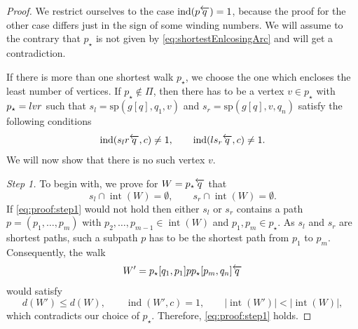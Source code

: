 \documentclass[reqno]{amsart}
\let\join\relax
\DeclareMathOperator{\join}{\dot{+}}
\DeclareMathOperator{\ind}{ind}
\DeclareMathOperator{\interior}{int}
\begin{document}
\begin{proof}
We restrict ourselves to the case $\ind(p \join \overleftarrow{q})= 1$, because the proof for the other case differs just in the sign of some winding numbers. We will assume to the contrary that $p_\star$ is not given by \eqref{eq:shortestEnlcosingArc} and will get a contradiction. 

If there is more than one shortest walk $p_\star$, we choose the one which encloses the least number of vertices. If $p_\star \notin \Pi$, then there has to be a vertex $v \in p_\star$ with $p_\star = l \join v \join r$ such that $s_l = \text{sp}(g[q],q_1,v)$ and $s_r = \text{sp}(g[q],v,q_n)$ satisfy the following conditions
\begin{equation}\label{eq:proof:assumption}
		\ind( s_l \join r \join \overleftarrow{q}, c ) \ne 1,\qquad
		\ind( l \join s_r \join \overleftarrow{q}, c ) \ne 1.
\end{equation}
We will now show that there is no such vertex $v$. 

\medskip

\emph{Step 1.} To begin with, we prove for $W = p_\star \join \overleftarrow{q}$ that
\begin{equation}\label{eq:proof:step1}
    s_l \cap \interior(W) = \emptyset, \qquad
    s_r \cap \interior(W) = \emptyset.
\end{equation}
If \eqref{eq:proof:step1} would not hold then either $s_l$ or $s_r$ contains a path $p = (p_1,\dots,p_m)$ with $p_2,\dots,p_{m-1} \in \interior(W)$ and $p_1, p_m \in p_\star$. As $s_l$ and $s_r$ are shortest paths, such a subpath $p$ has to be the shortest path from $p_1$ to $p_m$. Consequently, the walk 
\[
	W' = p_\star[q_1,p_1] \join p \join p_\star[p_m,q_n] \join \overleftarrow{q}
\]
would satisfy
\[
	d(W') \le d(W), \qquad \ind(W',c) = 1, \qquad |\interior(W')| < |\interior(W)|,
\]
which contradicts our choice of $p_\star$. Therefore, \eqref{eq:proof:step1} holds.
\medskip


\end{proof}
\end{document}
